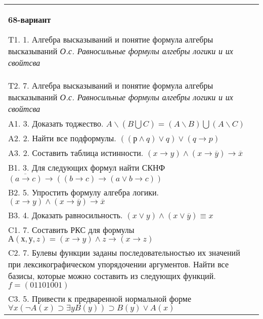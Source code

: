 \documentclass{article}
\begin{document}
\begin{tabular}{m{17cm}}
\textbf{68-вариант}
\newline

T1. 1. Алгебра высказываний и понятие формула алгебры высказываний \emph{О.с. Равносильные формулы алгебры логики и их свойтсва} \\
T2. 7. Алгебра высказываний и понятие формула алгебры высказываний \emph{О.с. Равносильные формулы алгебры логики и их свойтсва} \\
A1. 3. Доказать тоджество. \(A\backslash(B\bigcup C) = (A\backslash B)\bigcup(A\backslash C)\) \\
A2. 2. Найти все подформулы. \(\left( (р \land q) \vee q \right) \vee (q \rightarrow p)\) \\
A3. 2. Составить таблица истинности. \((x \rightarrow y) \land (x \rightarrow \overline{y}) \rightarrow \overline{x}\) \\
B1. 3. Для следующих формул найти СКНФ \(\overline{(a \rightarrow c)} \rightarrow \left( (b \rightarrow c) \rightarrow (a \vee b \rightarrow c) \right)\) \\
B2. 5. Упростить формулу алгебра логики. \((x \rightarrow y) \land (x \rightarrow \overline{y}) \rightarrow \overline{x}\) \\
B3. 4. Доказать равносильность. \((x \vee y) \land (x \vee \overline{y}) \equiv x\) \\
C1. 7. Составить РКС для формулы \(А(х,у,z) = (x \rightarrow y) \land z \rightarrow (x \rightarrow z)\) \\
C2. 7. Булевы функции заданы последовательностью их значений при лексикографическом упорядочении аргументов. Найти все базисы, которые можно составить из следующих функций. \(f = (01101001)\) \\
C3. 5. Привести к предваренной нормальной форме \(\forall x(\neg A(x) \supset \exists yB(y)) \supset B(y) \vee A(x)\) \\

\end{tabular}
\vspace{1cm}
\end{document}
